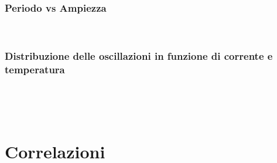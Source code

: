 \documentclass[11pt]{article}
\begin{document}
 
    \begin{center}
    \end{center}
    { \hspace*{\fill} \\}
    
    \begin{center}
    \end{center}
    { \hspace*{\fill} \\}
    
    \hypertarget{periodo-vs-ampiezza}{%
\subsubsection{Periodo vs Ampiezza}\label{periodo-vs-ampiezza}}

    \begin{center}
    \end{center}
    { \hspace*{\fill} \\}
    
    \hypertarget{distribuzione-delle-oscillazioni-in-funzione-di-corrente-e-temperatura}{%
\subsubsection{Distribuzione delle oscillazioni in funzione di corrente
e
temperatura}\label{distribuzione-delle-oscillazioni-in-funzione-di-corrente-e-temperatura}}


    \begin{center}
    \end{center}
    { \hspace*{\fill} \\}
    
    \begin{center}
    \end{center}
    { \hspace*{\fill} \\}
    
    \hypertarget{correlazioni}{%
\section{Correlazioni}\label{correlazioni}}
\end{document}
